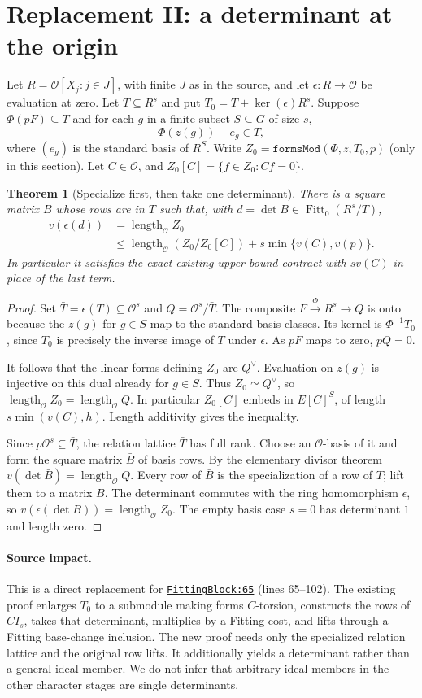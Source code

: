 \documentclass[11pt]{article}
\newtheorem{theorem}{Theorem}[section]
\theoremstyle{remark}\newtheorem{remark}[theorem]{Remark}
\newcommand{\Ocal}{\mathcal O}
\newcommand{\Fitt}{\operatorname{Fitt}_0}
\newcommand{\len}{\operatorname{length}_{\Ocal}}
\newcommand{\src}[2]{\href{https://github.com/VladimirReshetnikov/ProveIt/blob/9050b04000647d588d0c78d945180abcd3b0bcf7/Analysis/GeneralizedRiemannHypothesis/Lean/grh/src/#1}{\texttt{#2}}}
\begin{document}
\section{Replacement II: a determinant at the origin}
Let $R=\Ocal[X_j:j\in J]$, with finite $J$ as in the source, and let $\epsilon:R\to\Ocal$ be evaluation at zero. Let $T\subseteq R^s$ and put $T_0=T+\ker(\epsilon)R^s$. Suppose $\Phi(pF)\subseteq T$ and for each $g$ in a finite subset $S\subseteq G$ of size $s$,
\[
 \Phi(z(g))-e_g\in T,
\]
where $(e_g)$ is the standard basis of $R^S$. Write $Z_0=\texttt{formsMod}(\Phi,z,T_0,p)$ (only in this section). Let $C\in\Ocal$, and $Z_0[C]=\{f\in Z_0:Cf=0\}$.
\begin{theorem}[Specialize first, then take one determinant]\label{thm:constant}
There is a square matrix $B$ whose rows are in $T$ such that, with $d=\det B\in\Fitt(R^s/T)$,
\begin{align*}
 v(\epsilon(d))&=\len Z_0\\
 &\le \len(Z_0/Z_0[C])+s\min\{v(C),v(p)\}.
\end{align*}
In particular it satisfies the exact existing upper-bound contract with $s v(C)$ in place of the last term.
\end{theorem}
\begin{proof}
Set $\bar T=\epsilon(T)\subseteq\Ocal^s$ and $Q=\Ocal^s/\bar T$. The composite $F\xrightarrow{\Phi}R^s\to Q$ is onto because the $z(g)$ for $g\in S$ map to the standard basis classes. Its kernel is $\Phi^{-1}T_0$, since $T_0$ is precisely the inverse image of $\bar T$ under $\epsilon$. As $pF$ maps to zero, $pQ=0$.

It follows that the linear forms defining $Z_0$ are $Q^\vee$. Evaluation on $z(g)$ is injective on this dual already for $g\in S$. Thus $Z_0\simeq Q^\vee$, so $\len Z_0=\len Q$. In particular $Z_0[C]$ embeds in $E[C]^S$, of length $s\min(v(C),h)$. Length additivity gives the inequality.

Since $p\Ocal^s\subseteq\bar T$, the relation lattice $\bar T$ has full rank. Choose an $\Ocal$-basis of it and form the square matrix $\bar B$ of basis rows. By the elementary divisor theorem $v(\det\bar B)=\len Q$. Every row of $\bar B$ is the specialization of a row of $T$; lift them to a matrix $B$. The determinant commutes with the ring homomorphism $\epsilon$, so $v(\epsilon(\det B))=\len Z_0$. The empty basis case $s=0$ has determinant $1$ and length zero.
\end{proof}
\paragraph{Source impact.} This is a direct replacement for \src{New/Congruences/FirstOrder/FittingBlock.lean\#L65}{FittingBlock:65} (lines 65--102). The existing proof enlarges $T_0$ to a submodule making forms $C$-torsion, constructs the rows of $C I_s$, takes that determinant, multiplies by a Fitting cost, and lifts through a Fitting base-change inclusion. The new proof needs only the specialized relation lattice and the original row lifts. It additionally yields a determinant rather than a general ideal member. We do not infer that arbitrary ideal members in the other character stages are single determinants.
\end{document}
